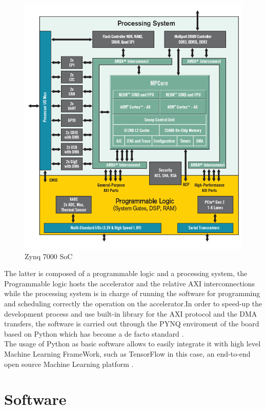 \begin{figure}[!htbp]
\centering
\captionsetup{justification=centering}
\includegraphics[scale=0.35]{./figure/zynq.PNG}
\caption{Zynq 7000 SoC\cite{paper:42}}
\label{fig:zynq}
\end{figure}

The latter is composed of a programmable logic and a processing system, the Programmable logic hosts the accelerator and the relative AXI interconnections while the processing system is in charge of running the software for programming and scheduling correctly the operation on the accelerator.\newline In order to speed-up the development process and use built-in library for the AXI protocol and the DMA transfers, the software is carried out through the PYNQ enviroment of the board \cite{WEBSITE:2} based on Python which has become a de facto standard \cite{paper:37}. \\
The usage of Python as basic software allows to easily integrate it with high level Machine Learning FrameWork, such as TensorFlow in this case, an end-to-end open source Machine Learning platform \cite{WEBSITE:4}. 
\newpage
\section{Software}

